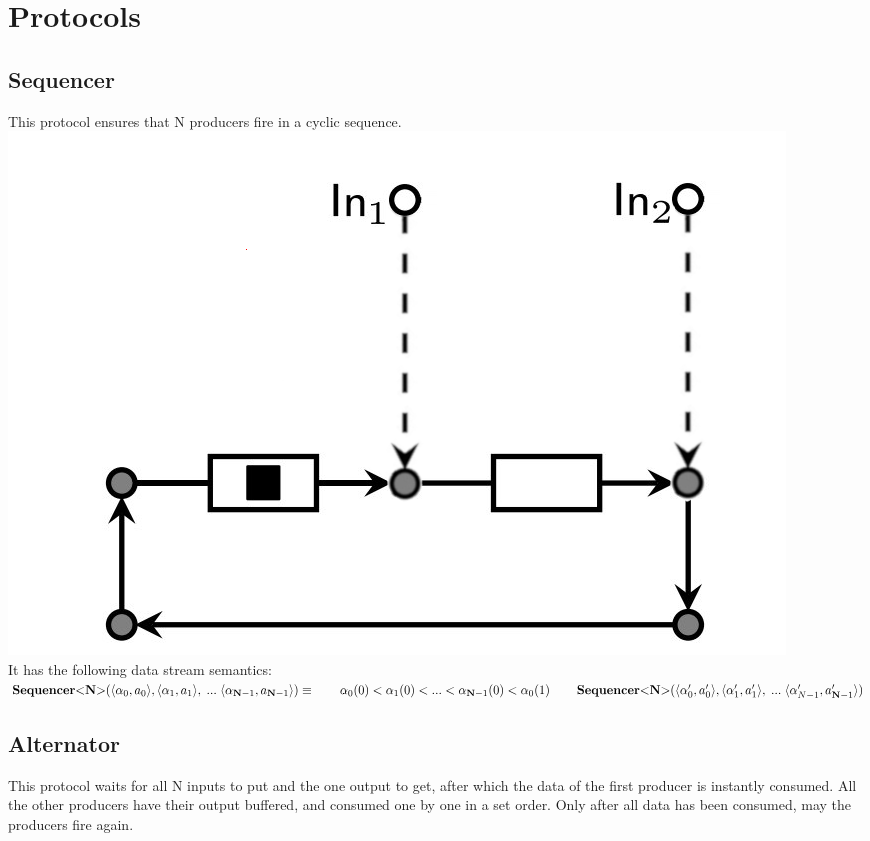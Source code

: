 \section{Protocols}
\subsection{Sequencer}
This protocol ensures that N producers fire in a cyclic sequence.\\

\includegraphics[]{img/seq.png}\\
%
It has the following data stream semantics:\\
%
$
\vspace{0.2cm}\sequencer (\langle \alpha_0, a_0 \rangle, \langle \alpha_1, a_1 \rangle,\;...\; \langle \alpha_{\textbf{N}-1}, a_{\textbf{N}-1} \rangle) \equiv \\
\vspace{0.2cm}\hphantom \qquad  \alpha_0(0) < \alpha_1(0) < ... < \alpha_{\textbf{N}-1}(0) < \alpha_0(1) \\
\hphantom \qquad \sequencer(\langle \alpha_0', a_0' \rangle, \langle \alpha_1', a_1' \rangle,\;...\; \langle \alpha_{N-1}', a_{\textbf{N}-1}' \rangle)
$


\subsection{Alternator}
This protocol waits for all N inputs to put and the one output to get, after which the data of the first producer is instantly consumed.
All the other producers have their output buffered, and consumed one by one in a set order.
Only after all data has been consumed, may the producers fire again.\\

